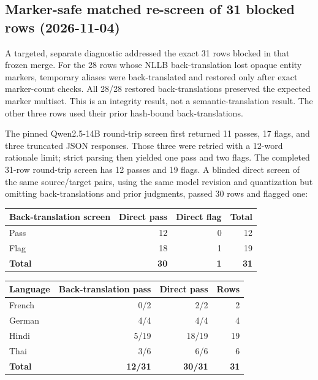 \documentclass[10pt,a4paper]{article}
\begin{document}
\subsection*{Marker-safe matched re-screen of 31 blocked rows (2026-11-04)}

A targeted, separate diagnostic addressed the exact 31 rows blocked in that frozen merge. For the 28 rows whose NLLB back-translation lost opaque entity markers, temporary aliases were back-translated and restored only after exact marker-count checks. All 28/28 restored back-translations preserved the expected marker multiset. This is an integrity result, not a semantic-translation result. The other three rows used their prior hash-bound back-translations.

The pinned Qwen2.5-14B round-trip screen first returned 11 passes, 17 flags, and three truncated JSON responses. Those three were retried with a 12-word rationale limit; strict parsing then yielded one pass and two flags. The completed 31-row round-trip screen has 12 passes and 19 flags. A blinded direct screen of the same source/target pairs, using the same model revision and quantization but omitting back-translations and prior judgments, passed 30 rows and flagged one:

\begin{center}
\small
\begin{tabular}{lrrr}
\toprule
Back-translation screen & Direct pass & Direct flag & Total \\
\midrule
Pass & 12 & 0 & 12 \\
Flag & 18 & 1 & 19 \\
\textbf{Total} & \textbf{30} & \textbf{1} & \textbf{31} \\
\bottomrule
\end{tabular}
\end{center}

\begin{center}
\small
\begin{tabular}{lrrr}
\toprule
Language & Back-translation pass & Direct pass & Rows \\
\midrule
French & 0/2 & 2/2 & 2 \\
German & 4/4 & 4/4 & 4 \\
Hindi & 5/19 & 18/19 & 19 \\
Thai & 3/6 & 6/6 & 6 \\
\textbf{Total} & \textbf{12/31} & \textbf{30/31} & \textbf{31} \\
\bottomrule
\end{tabular}
\end{center}
\end{document}

